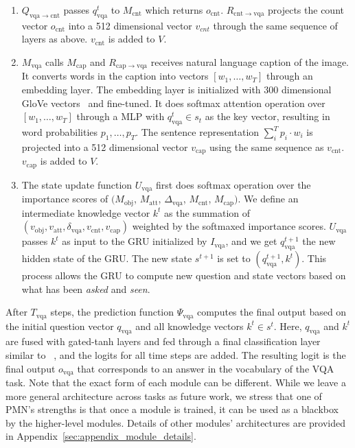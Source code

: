 \documentclass{article}
\def\Mobj{M_\mathrm{obj}}
\def\Matt{M_\mathrm{att}}
\def\Mcnt{M_\mathrm{cnt}}
\def\Mcap{M_\mathrm{cap}}
\def\Mvqa{M_\mathrm{vqa}}
\begin{document}
\begin{enumerate}[\hspace{0pt}(1)]
\item{
$Q_{\mathrm{vqa}\rightarrow \mathrm{cnt}}$ passes $q_\mathrm{vqa}^t$ to $\Mcnt$ which returns $o_\mathrm{cnt}$.
$R_{\mathrm{cnt}\rightarrow\mathrm{vqa}}$ projects the count vector $o_\mathrm{cnt}$ into a 512 dimensional vector $v_{cnt}$ through the same sequence of layers as above.
$v_\mathrm{cnt}$ is added to $V$.
} 

\item{
$\Mvqa$ calls  $\Mcap$ and
$R_{\mathrm{cap}\rightarrow\mathrm{vqa}}$ receives natural language caption of the image.
It converts words in the caption into vectors $[w_1,\ldots,w_T]$ through an embedding layer.
The embedding layer is initialized with 300 dimensional GloVe vectors~\citep{pennington14} and fine-tuned.
It does softmax attention operation over $[w_1,\ldots,w_T]$ through a MLP with $q_{\mathrm{vqa}}^t \in s_t$ as the key vector, resulting in word probabilities $p_1,\ldots,p_T$.
The sentence representation $\sum_{i}^{T} p_i \cdot w_i$ is projected into a 512 dimensional vector $v_\mathrm{cap}$ using the same sequence as $v_\mathrm{cnt}$. $v_\mathrm{cap}$ is added to $V$.
} 

\item{
The state update function $U_\mathrm{vqa}$ first does softmax operation over the importance scores of $(\Mobj$, $\Matt$, $\Delta_\mathrm{vqa}$, $\Mcnt$, $\Mcap)$.
We define an intermediate knowledge vector $k^t$ as the summation of $(v_\mathrm{obj}, v_\mathrm{att}, \delta_\mathrm{vqa}, v_\mathrm{cnt}, v_\mathrm{cap})$ weighted by the softmaxed importance scores.
$U_\mathrm{vqa}$ passes $k^t$ as input to the GRU initialized by $I_\mathrm{vqa}$, and we get $q_\mathrm{vqa}^{t+1}$ the new hidden state of the GRU.
The new state $s^{t+1}$ is set to $(q_\mathrm{vqa}^{t+1}, k^t)$.
This process allows the GRU to compute new question and state vectors based on what has been \emph{asked} and \emph{seen}.
} 
\end{enumerate}
After $T_{\mathrm{vqa}}$ steps, the prediction function $\Psi_\mathrm{vqa}$ computes the final output based on the initial question vector $q_\mathrm{vqa}$ and all knowledge vectors $k^t \in s^t$.
Here, $q_\mathrm{vqa}$ and $k^t$ are fused with gated-tanh layers and fed through a final classification layer similar to ~\citet{anderson17}, and the logits for all time steps are added.
The resulting logit is the final output $o_\mathrm{vqa}$ that corresponds to an answer in the vocabulary of the VQA task.
Note that the exact form of each module can be different.
While we leave a more general architecture across tasks as future work, we stress that one of PMN's strengths is that once a module is trained, it can be used as a blackbox by the higher-level modules.
Details of other modules' architectures are provided in Appendix~\ref{sec:appendix_module_details}.
\end{document}
